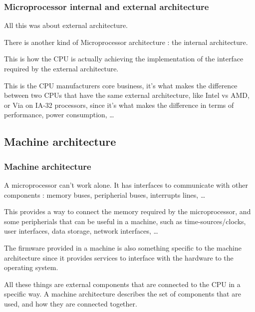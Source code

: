 \begin{frame}
  \frametitle{Microprocessor internal and external architecture}

  All this was about external architecture.

  \-

  There is another kind of Microprocessor architecture : the internal architecture.

  \-

  This is how the CPU is actually achieving the implementation of the interface required by the external architecture.

  \-

  This is the CPU manufacturers core business, it's what makes the difference between two CPUs that have the same external architecture, like Intel vs AMD, or Via on IA-32 processors, since it's what makes the difference in terms of performance, power consumption, \ldots

\end{frame}

\subsection{Machine architecture}

\begin{frame}
  \frametitle{Machine architecture}
  
  A microprocessor can't work alone. It has interfaces to communicate with other components : memory buses, peripherial buses, interrupts lines, \ldots

  \-

  This provides a way to connect the memory required by the microprocessor, and some peripherials that can be useful in a machine, such as time-sources/clocks, user interfaces, data storage, network interfaces, \ldots

  \-

  The firmware provided in a machine is also something specific to the machine architecture since it provides services to interface with the hardware to the operating system.

  \-

  All these things are external components that are connected to the CPU in a specific way. A machine architecture describes the set of components that are used, and how they are connected together.

\end{frame}

